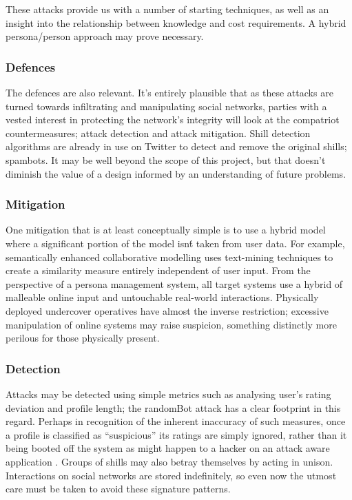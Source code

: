 These attacks provide us with a number of starting techniques, as well as an insight into the relationship between knowledge and cost requirements. A hybrid persona/person approach may prove necessary.

\subsubsection{Defences}

The defences are also relevant. It's entirely plausible that as these attacks
are turned towards infiltrating and manipulating social networks, parties with a
vested interest in protecting the network's integrity will look at the
compatriot countermeasures; attack detection and attack mitigation. Shill
detection algorithms are already in use on Twitter to detect and remove the
original shills; spambots. It may be well beyond the scope of this project, but
that doesn't diminish the value of a design informed by an understanding of
future problems.

\subsubsection{Mitigation}

One mitigation that is at least conceptually simple  is to use a hybrid model
where a significant portion of the model isn\'t taken from user data. For
example, semantically enhanced collaborative modelling uses text-mining
techniques to create a similarity measure entirely independent of user input.
From the perspective of a persona management system, all target systems use a
hybrid of malleable online input and untouchable real-world interactions.
Physically deployed undercover operatives have almost the inverse restriction;
excessive manipulation of online systems may raise suspicion, something
distinctly more perilous for those physically present.

\subsubsection{Detection}
Attacks may be detected using simple metrics such as analysing user's rating
deviation and profile length; the randomBot attack has a clear footprint in this
regard. Perhaps in recognition of the inherent inaccuracy of such measures, once
a profile is classified as ``suspicious'' its ratings are simply ignored, rather
than it being booted off the system as might happen to a hacker on an attack
aware application \cite{attackAware}. Groups of shills may also betray themselves by acting in unison. Interactions on social networks are stored indefinitely, so even now the utmost care must be taken to avoid these signature patterns.